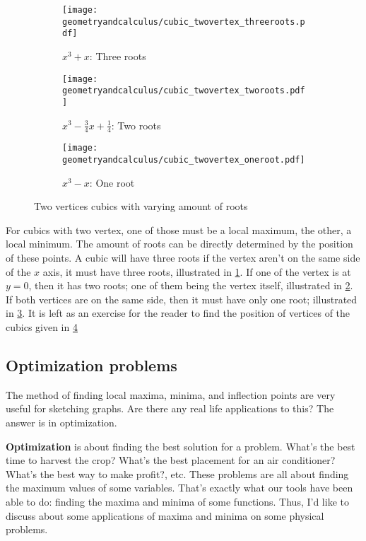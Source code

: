 \begin{figure}[ht]
	\centering
	\begin{subfigure}[t]{0.3\textwidth}
		\centering
		\texttt{[image: geometryandcalculus/cubic\_twovertex\_threeroots.pdf]}
		\caption{$x^3 + x$: Three roots}
		\label{fig:cubic_two_vertices_threeroots}
	\end{subfigure}
	\begin{subfigure}[t]{0.3\textwidth}
		\centering
		\texttt{[image: geometryandcalculus/cubic\_twovertex\_tworoots.pdf]}
		\caption{$x^3 - \frac{3}{4}x + \frac{1}{4}$: Two roots}
		\label{fig:cubic_two_vertices_tworoots}
	\end{subfigure}
	\begin{subfigure}[t]{0.3\textwidth}
		\centering
		\texttt{[image: geometryandcalculus/cubic\_twovertex\_oneroot.pdf]}
		\caption{$x^3 - x$: One root}
		\label{fig:cubic_two_vertices_oneroot}
	\end{subfigure}
	\caption{Two vertices cubics with varying amount of roots}
	\label{fig:cubic_two_vertices}
\end{figure}

For cubics with two vertex, one of those must be a local maximum, the other, a local minimum. The amount of roots can be directly determined by the position of these points. A cubic will have three roots if the vertex aren't on the same side of the $x$ axis, it must have three roots, illustrated in \cref{fig:cubic_two_vertices_threeroots}. If one of the vertex is at $y = 0$, then it has two roots; one of them being the vertex itself, illustrated in \cref{fig:cubic_two_vertices_tworoots}. If both vertices are on the same side, then it must have only one root; illustrated in \cref{fig:cubic_two_vertices_oneroot}. It is left as an exercise for the reader to find the position of vertices of the cubics given in \cref{fig:cubic_two_vertices}

\subsection{Optimization problems}

The method of finding local maxima, minima, and inflection points are very useful for sketching graphs. Are there any real life applications to this? The answer is in optimization.

\textbf{Optimization} is about finding the best solution for a problem. What's the best time to harvest the crop? What's the best placement for an air conditioner? What's the best way to make profit?, etc. These problems are all about finding the maximum values of some variables. That's exactly what our tools have been able to do: finding the maxima and minima of some functions. Thus, I'd like to discuss about some applications of maxima and minima on some physical problems. 

